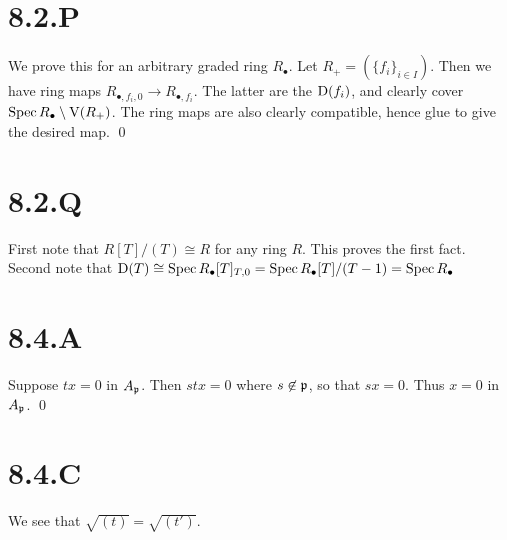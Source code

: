 \documentclass{article}
\begin{document}
\section{8.2.P}
We prove this for an arbitrary graded ring $R_{\bullet}$. Let
$R_+=(\{f_i\}_{i \in I})$. Then we have ring maps $R_{\bullet, f_i, 0} \to R_{\bullet, f_i}$. The
latter are the $\operatorname{D}(f_i)$, and clearly cover
$\operatorname{Spec} R_{\bullet} \setminus \operatorname{V}(R_+)$. The ring maps are also clearly compatible, hence glue
to give the desired map. \qed

\section{8.2.Q}
First note that $R[T]/(T) \cong R$ for any ring $R$.
This proves the first fact. Second note that $\operatorname{D}(T) \cong \operatorname{Spec} R_{\bullet}[T]_{T, 0} = \operatorname{Spec}
    R_{\bullet}[T]/(T-1)=\operatorname{Spec} R_{\bullet}$

\section{8.4.A}
Suppose $tx=0$ in $A_{\mathfrak{p}}$. Then
$stx=0$ where $s \not \in \mathfrak{p}$, so that
$sx=0$. Thus $x=0$ in
$A_{\mathfrak{p}}$. \qed

\section{8.4.C}
We see that $\sqrt{(t)}=\sqrt{(t')}$.
\end{document}
